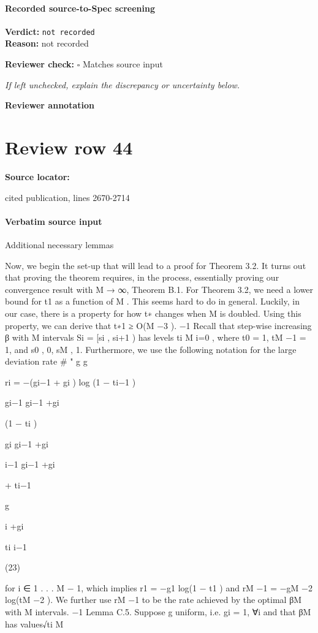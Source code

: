 \documentclass[10pt]{article}
\newcommand{\reviewerbox}{%
  \par\noindent\fbox{\parbox{0.96\linewidth}{\rule{0pt}{0.38in}}}\par
}
\newcommand{\reviewmatch}[1]{%
  \par\noindent\textbf{Reviewer check:} $\square$\; #1\par
  \noindent\emph{If left unchecked, explain the discrepancy or uncertainty below.}\par
}
\begin{document}
\paragraph{Recorded source-to-Spec screening}
\textbf{Verdict:} \texttt{not recorded}
\\
\textbf{Reason:} not recorded
\reviewmatch{Matches source input}
\noindent\textbf{Reviewer annotation}\par
\reviewerbox
\clearpage
\hypertarget{source-claim-f9871b4133903309}{}
\section*{Review row 44}
\textbf{Source locator:} {\footnotesize\raggedright cited publication, lines 2670-\allowbreak{}2714\par}
\paragraph{Verbatim source input}
\begin{ReviewVerbatim}
Additional necessary lemmas

Now, we begin the set-up that will lead to a proof for Theorem 3.2. It turns out that proving the
theorem requires, in the process, essentially proving our convergence result with M → ∞, Theorem B.1. For Theorem 3.2, we need a lower bound for t1 as a function of M . This seems hard
to do in general. Luckily, in our case, there is a property for how t∗ changes when M is doubled.
Using this property, we can derive that t∗1 ≥ O(M −3 ).
−1
Recall that step-wise increasing β with M intervals Si = [si , si+1 ) has levels {ti }M
i=0 , where
t0 = 1, tM −1 = 1, and s0 , 0, sM , 1.
Furthermore, we use the following notation for the large deviation rate
#
"
g
g

ri = −(gi−1 + gi ) log (1 − ti−1 )

gi−1
gi−1 +gi

(1 − ti )

gi
gi−1 +gi

i−1
gi−1 +gi

+ ti−1

g

i
+gi

ti i−1

(23)

for i ∈ {1 . . . M − 1}, which implies r1 = −g1 log(1 − t1 ) and rM −1 = −gM −2 log(tM −2 ).
We further use rM −1 to be the rate achieved by the optimal βM with M intervals.
−1
Lemma C.5. Suppose g uniform, i.e. gi = 1, ∀i and that βM has values√{ti }M
\end{ReviewVerbatim}
\end{document}
